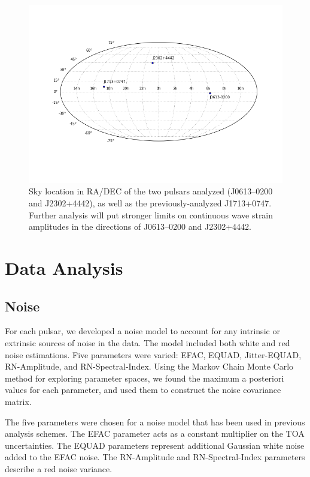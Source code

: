\documentclass[12pt]{article}
\begin{document}
\begin{figure}[h!]
    \caption{Sky location in RA/DEC of the two pulsars analyzed (J0613--0200 and
J2302+4442), as well as the previously-analyzed J1713+0747. Further analysis
will put stronger limits on continuous wave strain amplitudes in the directions
of J0613--0200 and J2302+4442.}
    \includegraphics[width=\textwidth]{./figures/skyplot.png}
\end{figure}



\section{Data Analysis}
\subsection{Noise}
   For each pulsar, we developed a noise model to account for any intrinsic or
extrinsic sources of noise in the data. The model included both white and red
noise estimations. Five parameters were varied: EFAC, EQUAD, Jitter-EQUAD,
RN-Amplitude, and RN-Spectral-Index. Using the Markov Chain Monte Carlo method
for exploring parameter spaces, we found the maximum a posteriori values for
each parameter, and used them to construct the noise covariance matrix.

The five parameters were chosen for a noise model that has been used in
previous analysis schemes. The EFAC parameter acts as a constant multiplier on
the TOA uncertainties. The EQUAD parameters represent additional Gaussian white
noise added to the EFAC noise. The RN-Amplitude and RN-Spectral-Index parameters
describe a red noise variance. 
\end{document}
